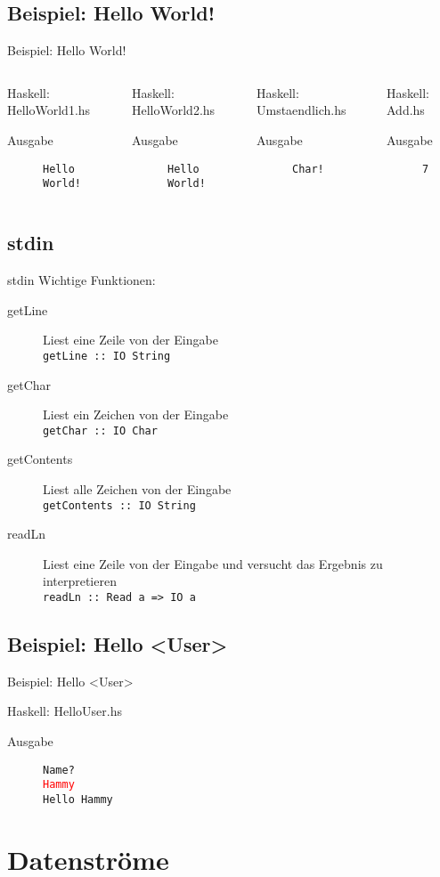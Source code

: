 \documentclass{beamer}
\newcommand{\outputcode}[3]
{
	\begin{block}{#1: #2}
	
	\begin{description}
	\item[Ausgabe]\texttt{#3}
	\end{description}
	\end{block}
}
\begin{document}
\subsection{Beispiel: Hello World!}
\begin{frame}[<+->][fragile]{Beispiel: Hello World!}
\tiny
\begin{columns}
\outputcode{Haskell}{HelloWorld1.hs}{Hello \\ World!}
\outputcode{Haskell}{HelloWorld2.hs}{Hello World!}
\outputcode{Haskell}{Umstaendlich.hs}{Char!}
\outputcode{Haskell}{Add.hs}{7}
\end{columns}
\end{frame}

\subsection{stdin}
\begin{frame}[<+->]{stdin}
Wichtige Funktionen:
\begin{description}
\item[getLine] Liest eine Zeile von der Eingabe \\ \texttt{getLine :: IO String}
\item[getChar] Liest ein Zeichen von der Eingabe \\ \texttt{getChar :: IO Char}
\item[getContents] Liest alle Zeichen von der Eingabe \\ \texttt{getContents :: IO String}
\item[readLn] Liest eine Zeile von der Eingabe und versucht das Ergebnis zu interpretieren \\ \texttt{readLn :: Read a => IO a}
\end{description}
\end{frame}


\subsection{Beispiel: Hello <User>}
\begin{frame}[<+->][fragile]{Beispiel: Hello <User>}
\outputcode{Haskell}{HelloUser.hs}{Name?\\ \textcolor{red}{Hammy}\\Hello Hammy}
\end{frame}

\section{Datenströme}
\end{document}
